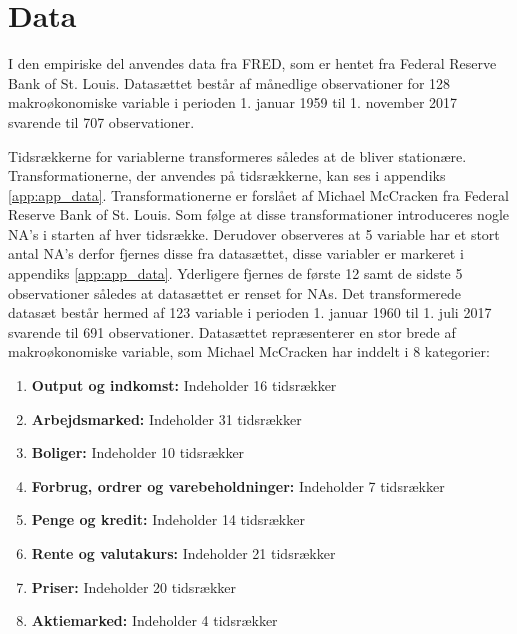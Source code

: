 \chapter{Data} \label{ch:data}
I den empiriske del anvendes data fra FRED, som er hentet fra Federal Reserve Bank of St. Louis.
Datasættet består af månedlige observationer for 128 makroøkonomiske variable i perioden 1. januar 1959 til 1. november 2017 svarende til 707 observationer.

Tidsrækkerne for variablerne transformeres således at de bliver stationære.
Transformationerne, der anvendes på tidsrækkerne, kan ses i appendiks \ref{app:app_data}.
Transformationerne er forslået af Michael McCracken fra Federal Reserve Bank of St. Louis.  
Som følge at disse transformationer introduceres nogle NA's i starten af hver tidsrække.
Derudover observeres at 5 variable har et stort antal NA's derfor fjernes disse fra datasættet, disse variabler er markeret i appendiks \ref{app:app_data}.
Yderligere fjernes de første 12 samt de sidste 5 observationer således at datasættet er renset for NAs.
Det transformerede datasæt består hermed af 123 variable i perioden 1. januar 1960 til 1. juli 2017 svarende til 691 observationer.
%
Datasættet repræsenterer en stor brede af makroøkonomiske variable, som Michael McCracken har inddelt i 8 kategorier: 
\begin{enumerate}
\item \textbf{Output og indkomst:} Indeholder 16 tidsrækker
\item \textbf{Arbejdsmarked:}  Indeholder 31 tidsrækker
\item \textbf{Boliger:} Indeholder 10 tidsrækker
\item \textbf{Forbrug, ordrer og varebeholdninger:} Indeholder 7 tidsrækker
\item \textbf{Penge og kredit:} Indeholder 14 tidsrækker
\item\textbf{ Rente og valutakurs:} Indeholder 21 tidsrækker
\item \textbf{Priser:} Indeholder 20 tidsrækker
\item \textbf{Aktiemarked:} Indeholder 4 tidsrækker
\end{enumerate}
